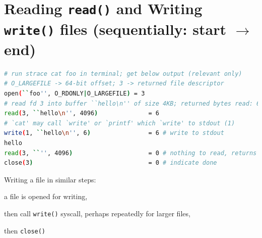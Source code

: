 \section*{Reading \texttt{read()} and Writing \texttt{write()} files (sequentially: start $\to$ end)}
\begin{lstlisting}[language=bash]
# run strace cat foo in terminal; get below output (relevant only)
# O_LARGEFILE -> 64-bit offset; 3 -> returned file descriptor
open(``foo'', O_RDONLY|O_LARGEFILE) = 3
# read fd 3 into buffer ``hello\n'' of size 4KB; returned bytes read: 6
read(3, ``hello\n'', 4096)              = 6
# `cat' may call `write' or `printf' which `write' to stdout (1)
write(1, ``hello\n'', 6)                = 6 # write to stdout
hello
read(3, ``'', 4096)                     = 0 # nothing to read, returns 0
close(3)                                = 0 # indicate done
\end{lstlisting}
Writing a file in similar steps:
\begin{enumerate*}[label={\alph*.},font={\color{red!50!black}\bfseries}]
\item a file is opened for writing,
\item then call \texttt{write()} syscall, perhaps repeatedly for larger files,
\item then \texttt{close()}
\end{enumerate*}
